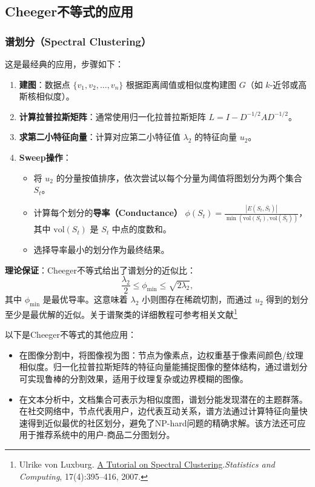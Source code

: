 \subsection{Cheeger不等式的应用}

\subsubsection{谱划分（Spectral Clustering）}
这是最经典的应用，步骤如下：
\begin{enumerate}
    \item \textbf{建图}：数据点 $\{v_1, v_2, \dots, v_n\}$ 根据距离阈值或相似度构建图 $G$（如 $k$-近邻或高斯核相似度）。
    \item \textbf{计算拉普拉斯矩阵}：通常使用归一化拉普拉斯矩阵 $L = I - D^{-1/2} A D^{-1/2}$。
    \item \textbf{求第二小特征向量}：计算对应第二小特征值 $\lambda_2$ 的特征向量 $u_2$。
    \item \textbf{Sweep操作}：
    \begin{itemize}
        \item 将 $u_2$ 的分量按值排序，依次尝试以每个分量为阈值将图划分为两个集合 $S_t$。
        \item 计算每个划分的\textbf{导率（Conductance）} $\phi(S_t) = \frac{|E(S_t, \bar{S_t})|}{\min(\text{vol}(S_t), \text{vol}(\bar{S_t}))}$，其中 $\text{vol}(S_t)$ 是 $S_t$ 中点的度数和。
        \item 选择导率最小的划分作为最终结果。
    \end{itemize}
\end{enumerate}

\textbf{理论保证}：Cheeger不等式给出了谱划分的近似比：
\[
\frac{\lambda_2}{2} \leq \phi_{\min} \leq \sqrt{2\lambda_2},
\]
其中 $\phi_{\min}$ 是最优导率。这意味着 $\lambda_2$ 小则图存在稀疏切割，而通过 $u_2$ 得到的划分至少是最优解的近似。关于谱聚类的详细教程可参考相关文献\footnote{Ulrike von Luxburg. \href{https://arxiv.org/abs/0711.0189}{A Tutorial on Spectral Clustering}.\textit{Statistics and Computing}, 17(4):395–416, 2007.} 

以下是Cheeger不等式的其他应用：\begin{itemize}
    \item 在图像分割中，将图像视为图：节点为像素点，边权重基于像素间颜色/纹理相似度。归一化拉普拉斯矩阵的特征向量能捕捉图像的整体结构，通过谱划分可实现鲁棒的分割效果，适用于纹理复杂或边界模糊的图像。
    \item 在文本分析中，文档集合可表示为相似度图，谱划分能发现潜在的主题群落。在社交网络中，节点代表用户，边代表互动关系，谱方法通过计算特征向量快速得到近似最优的社区划分，避免了NP-hard问题的精确求解。该方法还可应用于推荐系统中的用户-商品二分图划分。
\end{itemize}











